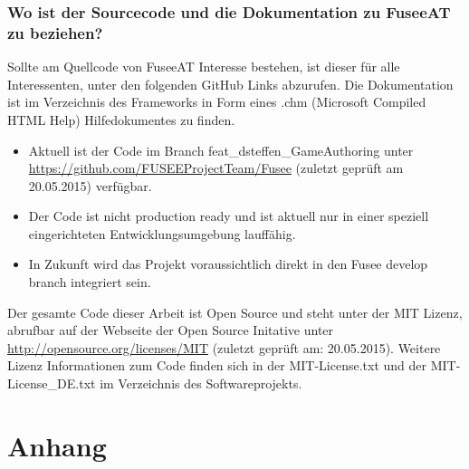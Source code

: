 \documentclass[pagesize, paper=a4, fontsize=12pt, titlepage=true, headings=small, headnosepline, abstractoff, liststotoc, nochapterprefix, plainheadsepline, twoside]{scrreprt}
\begin{document}
\section {Wo ist der Sourcecode und die Dokumentation zu FuseeAT zu beziehen?}
Sollte am Quellcode von FuseeAT Interesse bestehen, ist dieser für alle Interessenten, unter den folgenden GitHub Links abzurufen. Die Dokumentation ist im Verzeichnis des Frameworks in Form eines .chm (Microsoft Compiled HTML Help) Hilfedokumentes zu finden.
\begin{itemize}
\item Aktuell ist der Code im Branch {feat\_dsteffen\_GameAuthoring} unter \url{https://github.com/FUSEEProjectTeam/Fusee} (zuletzt geprüft am 20.05.2015) verfügbar.
\item Der Code ist nicht production ready und ist aktuell nur in einer speziell eingerichteten Entwicklungsumgebung lauffähig.
\item In Zukunft wird das Projekt voraussichtlich direkt in den Fusee develop branch integriert sein.
\end{itemize}

Der gesamte Code dieser Arbeit ist Open Source und steht unter der MIT Lizenz, abrufbar auf der Webseite der Open Source Initative unter \url{http://opensource.org/licenses/MIT} (zuletzt geprüft am: 20.05.2015). Weitere Lizenz Informationen zum Code finden sich in der MIT-License.txt und der MIT-License\_DE.txt im Verzeichnis des Softwareprojekts.



\part*{Anhang}

\printbibliography[nottype=misc, title=Literaturverzeichnis]

\printbibliography[type={misc}, title=Software und Applikationsverzeichnis]
\end{document}

